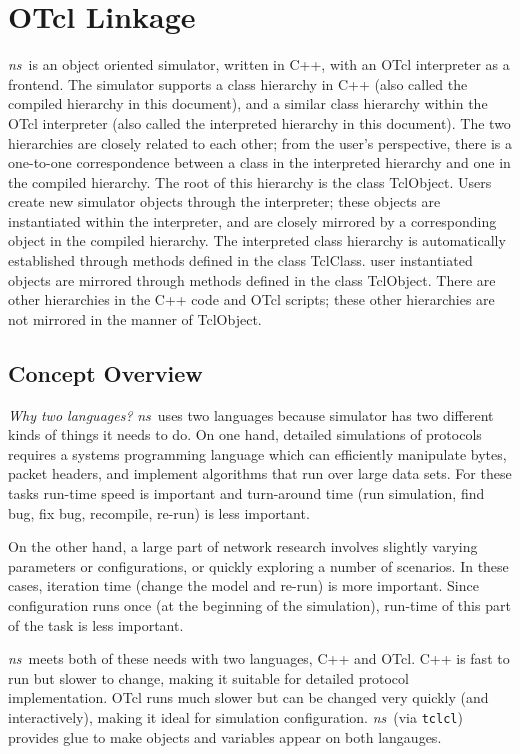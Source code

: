 \chapter{OTcl Linkage}
\label{chap:otcl:intro}

\emph{ns}\ is an object oriented simulator,
written in C++, with an OTcl interpreter as a frontend.
The simulator supports a class hierarchy in C++
(also called the compiled hierarchy in this document),
and a similar class hierarchy within the OTcl interpreter
(also called the interpreted hierarchy in this document).
The two hierarchies are closely related to each other;
from the user's perspective,
there is a one-to-one correspondence
between a class in the interpreted hierarchy
and one in the compiled hierarchy.
The root of this hierarchy is the class TclObject.
Users create new simulator objects through the interpreter;
these objects are instantiated within the interpreter, 
and are closely mirrored by a corresponding object
in the compiled hierarchy.
The interpreted class hierarchy is automatically established through
methods defined in the class TclClass.
user instantiated objects are mirrored through methods
defined in the class TclObject.
There are other hierarchies in the C++ code and OTcl scripts;
these other hierarchies are not mirrored in the manner of TclObject.

\section{Concept Overview}

\emph{Why two languages?}
\emph{ns}\ uses two languages because simulator has two different
  kinds of things it needs to do.
On one hand, detailed simulations of protocols
  requires a systems programming language
  which can efficiently manipulate bytes, packet headers,
  and implement algorithms that run over large data sets.
For these tasks run-time speed is important and
  turn-around time (run simulation, find bug, fix bug, recompile, re-run)
  is less important.

On the other hand,
  a large part of network research involves slightly varying
  parameters or configurations,
  or quickly exploring a number of scenarios.
In these cases, iteration time (change the model and re-run)
  is more important.
Since configuration runs once (at the beginning of the simulation),
  run-time of this part of the task is less important.

\emph{ns}\ meets both of these needs with two languages,
  C++ and OTcl.
C++ is fast to run but slower to change, making it suitable
  for detailed protocol implementation.
OTcl runs much slower but can be changed very quickly (and interactively),
  making it ideal for simulation configuration.
\emph{ns}\ (via {\tt tclcl})
  provides glue to make objects and variables appear on both langauges.


